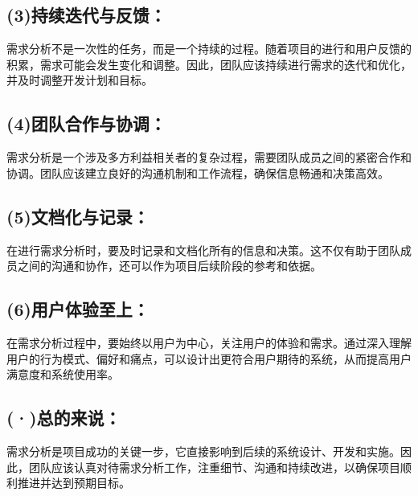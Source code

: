 \documentclass[24pt,a4paper]{article}%
\begin{document}
\subsection*{\songti (3)持续迭代与反馈：}
需求分析不是一次性的任务，而是一个持续的过程。随着项目的进行和用户反馈的积累，需求可能会发生变化和调整。因此，团队应该持续进行需求的迭代和优化，并及时调整开发计划和目标。
\subsection*{\songti (4)团队合作与协调：}
需求分析是一个涉及多方利益相关者的复杂过程，需要团队成员之间的紧密合作和协调。团队应该建立良好的沟通机制和工作流程，确保信息畅通和决策高效。
\subsection*{\songti (5)文档化与记录：}
在进行需求分析时，要及时记录和文档化所有的信息和决策。这不仅有助于团队成员之间的沟通和协作，还可以作为项目后续阶段的参考和依据。
\subsection*{\songti (6)用户体验至上：}
在需求分析过程中，要始终以用户为中心，关注用户的体验和需求。通过深入理解用户的行为模式、偏好和痛点，可以设计出更符合用户期待的系统，从而提高用户满意度和系统使用率。
\subsection*{\songti (·)总的来说：}
需求分析是项目成功的关键一步，它直接影响到后续的系统设计、开发和实施。因此，团队应该认真对待需求分析工作，注重细节、沟通和持续改进，以确保项目顺利推进并达到预期目标。
\newpage
\end{document}
